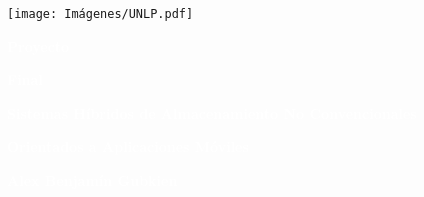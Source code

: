 \pagecolor{UNLPVerde}\afterpage{\nopagecolor}

\texttt{[image: Imágenes/UNLP.pdf]}

\vspace*{1cm}

\fontsize{70}{75}\selectfont \textcolor{white}{\textbf{Proyecto}}

\fontsize{70}{75}\selectfont \textcolor{white}{\textbf{Final}}


\vspace{10mm}

\Large\textcolor{white}{\textbf{Sistemas Híbridos de Almacenamiento No Convencionales }}
\par
\Large\textcolor{white}{\textbf{Orientados a Aplicaciones Móviles}}
\vspace{125mm}

\normalsize
\textcolor{white}{\textbf{Alex Benjamín Gubkien}}



\thispagestyle{empty}


\restoregeometry   
\newpage